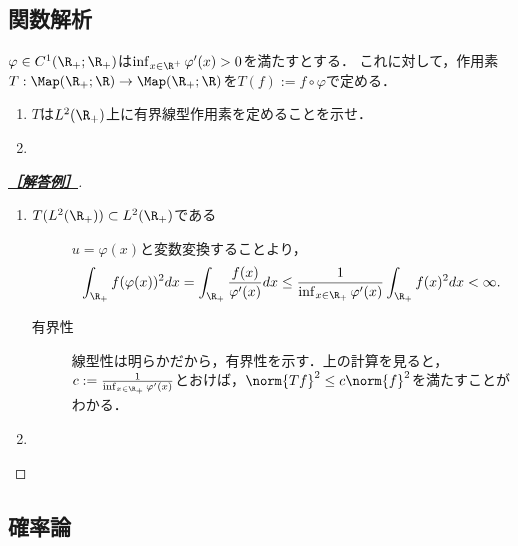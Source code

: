 \documentclass[uplatex,dvipdfmx]{jsarticle}
\begin{document}
\subsection{関数解析}

\begin{tcolorbox}[colframe=ForestGreen, colback=ForestGreen!10!white,breakable,colbacktitle=ForestGreen!40!white,coltitle=black,fonttitle=\bfseries\sffamily,
    title=B 第9問（関数解析）]
    $\varphi\in C^1(\R_+;\R_+)$は$\inf_{x\in\R^+}\varphi'(x)>0$を満たすとする．
    これに対して，作用素$T:\Map(\R_+;\R)\to\Map(\R_+;\R)$を$T(f):=f\circ\varphi$で定める．
    \begin{enumerate}
        \item $T$は$L^2(\R_+)$上に有界線型作用素を定めることを示せ．
        \item 
    \end{enumerate}
\end{tcolorbox}
\begin{proof}[\textbf{\underline{［解答例］}}]\mbox{}
    \begin{enumerate}
        \item \begin{description}
            \item[$T(L^2(\R_+))\subset L^2(\R_+)$である] $u=\varphi(x)$と変数変換することより，
            \[\int_{\R_+}f(\varphi(x))^2dx=\int_{\R_+}\frac{f(x)}{\varphi'(x)}dx\le\frac{1}{\inf_{x\in\R_+}\varphi'(x)}\int_{\R_+}f(x)^2dx<\infty.\]
            \item[有界性] 線型性は明らかだから，有界性を示す．上の計算を見ると，$c:=\frac{1}{\inf_{x\in\R_+}\varphi'(x)}$とおけば，$\norm{Tf}^2\le c\norm{f}^2$を満たすことがわかる．
        \end{description}
        \item 
    \end{enumerate}
\end{proof}

\subsection{確率論}
\end{document}
